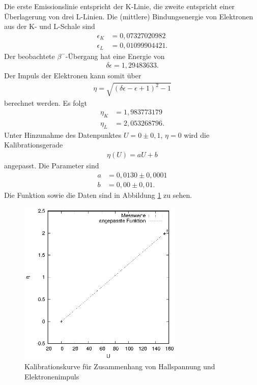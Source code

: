 Die erste Emissionslinie entspricht der K-Linie, die zweite entspricht einer Überlagerung von drei L-Linien. Die (mittlere) Bindungsenergie von Elektronen aus der K- und L-Schale sind
\begin{align*}
  \epsilon_K&=0,07327020982\\
  \epsilon_L&=0,01099904421.
\end{align*} 
Der beobachtete $\beta^-$-Übergang hat eine Energie von
\begin{align*}
  \delta\epsilon=1,29483633.
\end{align*}
Der Impuls der Elektronen kann somit über 
\begin{align*}
  \eta=\sqrt{(\delta\epsilon-\epsilon+1)^2-1}
\end{align*}
 berechnet werden. Es folgt
\begin{align*}
  \eta_K&=1,983773179\\
  \eta_L&=2,053268796.
\end{align*}
Unter Hinzunahme des Datenpunktes $U=0 \pm 0,1$, $\eta=0$ wird die Kalibrationsgerade 
\begin{align*}
  \eta(U)=aU+b
\end{align*}
angepasst. Die Parameter sind
\begin{align*}
  a&=0,0130 \pm 0,0001\\
  b&=0,00 \pm 0,01.
\end{align*}
Die Funktion sowie die Daten sind in Abbildung \ref{fig:kal} zu sehen.
\begin{figure}[h]
  \centering
  \includegraphics[width=0.7\textwidth]{data/kal.eps}
  \caption{Kalibrationskurve für Zusammenhang von Hallspannung und Elektronenimpuls}
  \label{fig:kal}
\end{figure}
